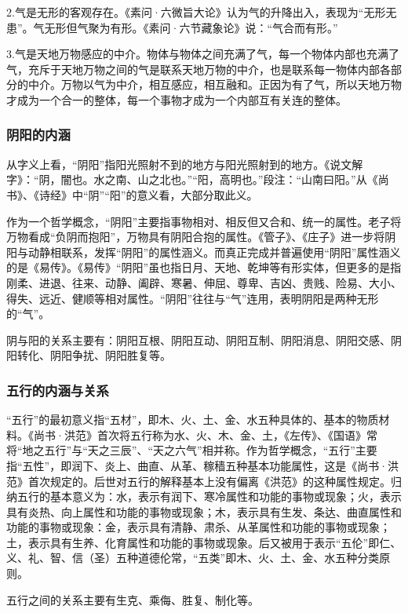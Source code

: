 \documentclass[draft,12pt]{ctexbook}
\begin{document}
2.气是无形的客观存在。《素问·六微旨大论》认为气的升降出入，表现为“无形无患”。气无形但气聚为有形。《素问·六节藏象论》说：“气合而有形。”

3.气是天地万物感应的中介。物体与物体之间充满了气，每一个物体内部也充满了气，充斥于天地万物之间的气是联系天地万物的中介，也是联系每一物体内部各部分的中介。万物以气为中介，相互感应，相互融和。正因为有了气，所以天地万物才成为一个合一的整体，每一个事物才成为一个内部互有关连的整体。

\subsubsection{阴阳的内涵}%

从字义上看，“阴阳”指阳光照射不到的地方与阳光照射到的地方。《说文解字》：“阴，闇也。水之南、山之北也。”“阳，高明也。”段注：“山南曰阳。”从《尚书》、《诗经》中“阴”“阳”的意义看，大部分取此义。

作为一个哲学概念，“阴阳”主要指事物相对、相反但又合和、统一的属性。老子将万物看成“负阴而抱阳”，万物具有阴阳合抱的属性。《管子》、《庄子》进一步将阴阳与动静相联系，发挥“阴阳”的属性涵义。而真正完成并普遍使用“阴阳”属性涵义的是《易传》。《易传》“阴阳”虽也指日月、天地、乾坤等有形实体，但更多的是指刚柔、进退、往来、动静、阖辟、寒暑、伸屈、尊卑、吉凶、贵贱、险易、大小、得失、远近、健顺等相对属性。“阴阳”往往与“气”连用，表明阴阳是两种无形的“气”。

阴与阳的关系主要有：阴阳互根、阴阳互动、阴阳互制、阴阳消息、阴阳交感、阴阳转化、阴阳争扰、阴阳胜复等。

\subsubsection{五行的内涵与关系}%

“五行”的最初意义指“五材”，即木、火、土、金、水五种具体的、基本的物质材料。《尚书·洪范》首次将五行称为水、火、木、金、土，《左传》、《国语》常将“地之五行”与“天之三辰”、“天之六气”相并称。作为哲学概念，“五行”主要指“五性”，即润下、炎上、曲直、从革、稼穑五种基本功能属性，这是《尚书·洪范》首次规定的。后世对五行的解释基本上没有偏离《洪范》的这种属性规定。归纳五行的基本意义为：水，表示有润下、寒冷属性和功能的事物或现象；火，表示具有炎热、向上属性和功能的事物或现象；木，表示具有生发、条达、曲直属性和功能的事物或现象：金，表示具有清静、肃杀、从革属性和功能的事物或现象；土，表示具有生养、化育属性和功能的事物或现象。后又被用于表示“五伦”即仁、义、礼、智、信（圣）五种道德伦常，“五类”即木、火、土、金、水五种分类原则。

五行之间的关系主要有生克、乘侮、胜复、制化等。
\end{document}
